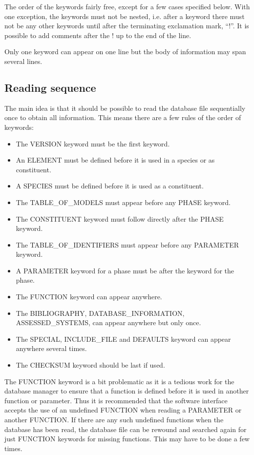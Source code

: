 \documentclass[12pt]{article}
\begin{document}
The order of the keywords fairly free, except for a few cases
specified below.  With one exception, the keywords must not be nested,
i.e.  after a keyword there must not be any other keywords until after
the terminating exclamation mark, ``!''.  It is possible to add
comments after the ! up to the end of the line.

Only one keyword can appear on one line but the body of information
may span several lines.

\subsection{Reading sequence}

The main idea is that it should be possible to read the database file
sequentially once to obtain all information.  This means there are a
few rules of the order of keywords:
\begin{itemize}
\item The VERSION keyword must be the first keyword.
\item An ELEMENT must be defined before it is used in a species or as
constituent.
\item A SPECIES must be defined before it is used as a constituent.
\item The TABLE\_OF\_MODELS must appear before any PHASE keyword.
\item The CONSTITUENT keyword must follow directly after the PHASE
  keyword.
\item The TABLE\_OF\_IDENTIFIERS must appear before any PARAMETER
  keyword.
\item A PARAMETER keyword for a phase must be after the keyword for
  the phase.
\item The FUNCTION keyword can appear anywhere.
\item The BIBLIOGRAPHY, DATABASE\_INFORMATION, 
  ASSESSED\_SYSTEMS, can appear anywhere but only once.
\item The SPECIAL, INCLUDE\_FILE and DEFAULTS keyword can appear
  anywhere several times.
\item The CHECKSUM keyword should be last if used.
\end{itemize}

The FUNCTION keyword is a bit problematic as it is a tedious work for
the database manager to ensure that a function is defined before it is
used in another function or parameter.  Thus it is recommended that
the software interface accepts the use of an undefined FUNCTION when
reading a PARAMETER or another FUNCTION.  If there are any such
undefined functions when the database has been read, the database file
can be rewound and searched again for just FUNCTION keywords for
missing functions.  This may have to be done a few times.
\end{document}

